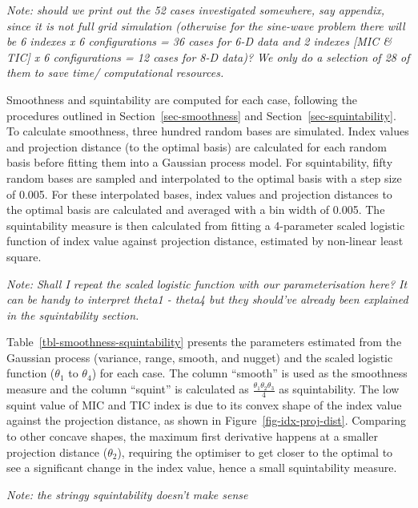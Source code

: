 \documentclass[
  number,
  preprint,
  3p]{elsarticle}
\begin{document}
\emph{Note: should we print out the 52 cases investigated somewhere, say
appendix, since it is not full grid simulation (otherwise for the
sine-wave problem there will be 6 indexes x 6 configurations = 36 cases
for 6-D data and 2 indexes {[}MIC \& TIC{]} x 6 configurations = 12
cases for 8-D data)? We only do a selection of 28 of them to save time/
computational resources.}

Smoothness and squintability are computed for each case, following the
procedures outlined in Section~\ref{sec-smoothness} and
Section~\ref{sec-squintability}. To calculate smoothness, three hundred
random bases are simulated. Index values and projection distance (to the
optimal basis) are calculated for each random basis before fitting them
into a Gaussian process model. For squintability, fifty random bases are
sampled and interpolated to the optimal basis with a step size of 0.005.
For these interpolated bases, index values and projection distances to
the optimal basis are calculated and averaged with a bin width of 0.005.
The squintability measure is then calculated from fitting a 4-parameter
scaled logistic function of index value against projection distance,
estimated by non-linear least square.

\emph{Note: Shall I repeat the scaled logistic function with our
parameterisation here? It can be handy to interpret theta1 - theta4 but
they should've already been explained in the squintability section.}

Table~\ref{tbl-smoothness-squintability} presents the parameters
estimated from the Gaussian process (variance, range, smooth, and
nugget) and the scaled logistic function (\(\theta_1\) to \(\theta_4\))
for each case. The column ``smooth'' is used as the smoothness measure
and the column ``squint'' is calculated as
\(\frac{\theta_1 \theta_2 \theta_3}{4}\) as squintability. The low
squint value of MIC and TIC index is due to its convex shape of the
index value against the projection distance, as shown in
Figure~\ref{fig-idx-proj-dist}. Comparing to other concave shapes, the
maximum first derivative happens at a smaller projection distance
(\(\theta_2\)), requiring the optimiser to get closer to the optimal to
see a significant change in the index value, hence a small squintability
measure.

\emph{Note: the stringy squintability doesn't make sense}
\end{document}
